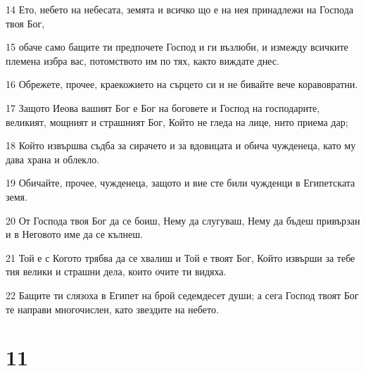 \par 14 Ето, небето на небесата, земята и всичко що е на нея принадлежи на Господа твоя Бог,
\par 15 обаче само бащите ти предпочете Господ и ги възлюби, и измежду всичките племена избра вас, потомството им по тях, както виждате днес.
\par 16 Обрежете, прочее, краекожието на сърцето си и не бивайте вече коравовратни.
\par 17 Защото Иеова вашият Бог е Бог на боговете и Господ на господарите, великият, мощният и страшният Бог, Който не гледа на лице, нито приема дар;
\par 18 Който извършва съдба за сирачето и за вдовицата и обича чужденеца, като му дава храна и облекло.
\par 19 Обичайте, прочее, чужденеца, защото и вие сте били чужденци в Египетската земя.
\par 20 От Господа твоя Бог да се боиш, Нему да слугуваш, Нему да бъдеш привързан и в Неговото име да се кълнеш.
\par 21 Той е с Когото трябва да се хвалиш и Той е твоят Бог, Който извърши за тебе тия велики и страшни дела, които очите ти видяха.
\par 22 Бащите ти слязоха в Египет на брой седемдесет души; а сега Господ твоят Бог те направи многочислен, като звездите на небето.

\chapter{11}

